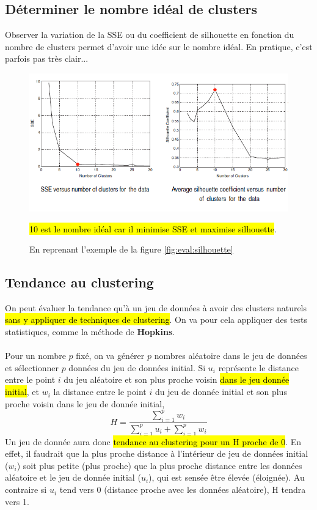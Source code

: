 \documentclass[letterpaper, 12pt]{article}
\newcommand{\alinea}{
\hspace*{0.5cm}}
\begin{document}
		\subsection{Déterminer le nombre idéal de clusters}
			\alinea Observer la variation de la SSE ou du coefficient
				de silhouette en fonction du nombre de clusters permet
				d'avoir une idée sur le nombre idéal. En pratique,
				c'est parfois pas très clair...
			\vspace*{-0.5cm}
			\begin{figure}[H]
				\centering
				\includegraphics[scale=0.65]{Images/clusters_number.png}
				\caption{En reprenant l'exemple de la figure
				\ref{fig:eval:silhouette}} \hl{10 est le nombre idéal car
				il minimise SSE et maximise silhouette}.
				\label{fig:eval:clusters_number}
			\end{figure}\noindent
		\newpage
		\subsection{Tendance au clustering}
			\alinea On peut évaluer la tendance qu'à un jeu de données à 
				avoir des clusters naturels \hl{sans y appliquer de 
				techniques de clustering}. On va pour cela appliquer
				des tests statistiques, comme la méthode de \textbf{Hopkins}.\\
			~\\
			\alinea Pour un nombre $p$ fixé, on va générer $p$ nombres
				aléatoire dans le jeu de données et sélectionner
				$p$ données du jeu de données initial. Si $u_i$ représente
				le distance entre le point $i$ du jeu aléatoire et son
				plus proche voisin \hl{dans le jeu donnée initial}, et $w_i$
				la distance entre le point $i$ du jeu de donnée initial
				et son plus proche voisin dans le jeu de donnée initial,
				$$ H = \frac{\sum_{i=1}^{p} w_i}{\sum_{i=1}^{p} u_i +
												 \sum_{i=1}^{p} w_i} $$
				Un jeu de donnée aura donc \hl{tendance au clustering pour
				un H proche de 0}. En effet, il faudrait que la plus proche
				distance à l'intérieur de jeu de données initial ($w_i$)
				soit plus petite (plus proche) que la plus proche distance
				entre les données aléatoire et le jeu de donnée initial
				($u_i$), qui est sensée être élevée (éloignée). Au contraire
				si $u_i$ tend vers 0 (distance proche avec les données 
				aléatoire), H tendra vers 1.
\end{document}
